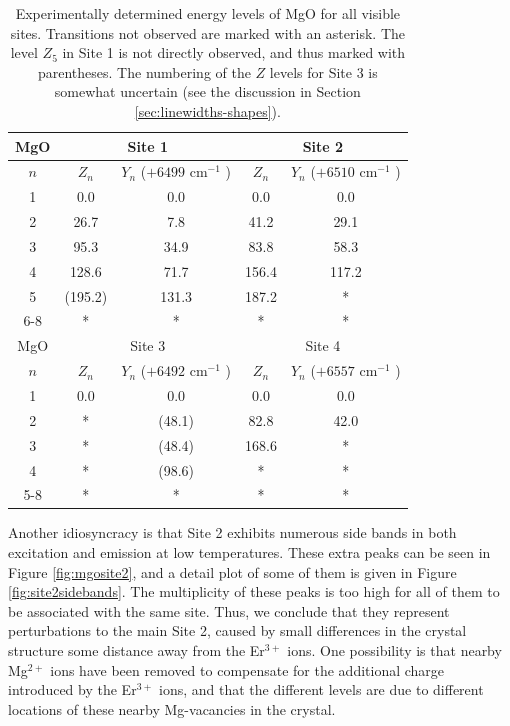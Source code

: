 \documentclass[12pt]{report}
\newcommand{\erbium}[1][ ]{Er$^{3+}$#1}
\newcommand{\wn}[1][ ]{cm$^{-1}$#1}
\begin{document}
\begin{table}[t]
  \centering
  \begin{tabular}{| c | c | c | c | c |}
    \hline
    MgO & \multicolumn{2}{c|}{Site 1}& \multicolumn{2}{c|}{Site 2} \\
    \hline
    $n$ & $Z_{n}$ & $Y_{n}$ ($+6499$ \wn) & $Z_{n}$ & $Y_{n}$ ($+6510$ \wn) \\
    \hline 
    1 & 0.0 & 0.0 & 0.0 & 0.0 \\
    2 & 26.7 & 7.8 & 41.2 & 29.1 \\
    3 & 95.3 & 34.9 & 83.8 & 58.3 \\
    4 & 128.6 & 71.7 & 156.4 & 117.2 \\
    5 & (195.2) & 131.3 & 187.2 & * \\
    6-8 & * & * & * & * \\
    \hline \hline
    MgO & \multicolumn{2}{c|}{Site 3}& \multicolumn{2}{c|}{Site 4} \\
    \hline
    $n$ & $Z_{n}$ & $Y_{n}$ ($+6492$ \wn) & $Z_{n}$ & $Y_{n}$ ($+6557$ \wn)\\
    \hline 
    1 & 0.0 & 0.0 & 0.0 & 0.0  \\
    2 & * & (48.1) & 82.8 & 42.0 \\
    3 & * & (48.4) & 168.6 & *  \\
    4 & * & (98.6) & * & * \\
    5-8 & * & * & * & * \\
    \hline
  \end{tabular}
  \caption{Experimentally determined energy levels of MgO for all visible sites. Transitions not observed are marked with an asterisk. The level $Z_{5}$ in Site 1 is not directly observed, and thus marked with parentheses. The numbering of the $Z$ levels for Site 3 is somewhat uncertain (see the discussion in Section \ref{sec:linewidths-shapes}).}
  \label{tab:mgolevels}
\end{table}

Another idiosyncracy is that Site 2 exhibits numerous side bands in both excitation and emission at low temperatures. These extra peaks can be seen in Figure \ref{fig:mgosite2}, and a detail plot of some of them is given in Figure \ref{fig:site2sidebands}. The multiplicity of these peaks is too high for all of them to be associated with the same site. Thus, we conclude that they represent perturbations to the main Site 2, caused by small differences in the crystal structure some distance away from the \erbium ions. One possibility is that nearby Mg$^{2+}$ ions have been removed to compensate for the additional charge introduced by the \erbium ions, and that the different levels are due to different locations of these nearby Mg-vacancies in the crystal.
\end{document}
